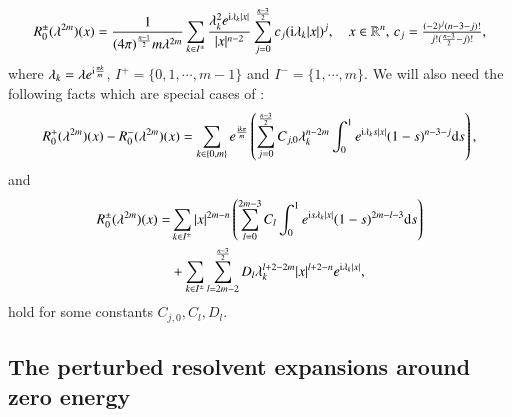 \documentclass[11pt,reqno]{amsart}
\def\d{{\rm d}}
\def\i{{\rm i}}
\numberwithin{equation}{section}
\theoremstyle{definition}
\begin{document}
\begin{equation}\label{eq2.8}
R_0^{\pm}(\lambda^{2m})(x)=\frac{1}{(4\pi)^{\frac{n-1}{2}}m\lambda^{2m}}\sum_{k\in I^{\pm}}\frac{\lambda_k^2e^{ \i\lambda_k|x|}}{|x|^{n-2}}\sum^{\frac{n-3}{2}}_{j=0}{c_j(\i\lambda_k|x|)^j},\quad x\in\mathbb{R}^n,\,\mbox{$c_j=\frac{(-2)^j(n-3-j)!}{j!(\frac{n-3}{2}-j)!}$},
\end{equation}
where $\lambda_k=\lambda e^{\i\frac{\pi k}{m}}$, $I^+=\{0,1,\cdots,m-1\}$ and $I^-=\{1,\cdots,m\}$. We will also need the following facts which are special cases of \cite[Proposition 2.1]{CHHZ}:
%
%
%
\begin{equation}\label{eq2.10}
	R_{0}^{+}(\lambda^{2m})(x)-R_{0}^{-}(\lambda^{2m})(x)=\sum_{k\in\{0,m\}}e^{\frac{\i k\pi}{m}}\left( \sum_{j=0}^{\frac{n-3}{2}}C_{j,0}\lambda_k^{n-2m}\int_{0}^{1}e^{\i\lambda_{k}s|x|}(1-s)^{n-3-j}\d s\right),
\end{equation}
and
\begin{equation}\label{equ4.17}
	\begin{split}
		R_{0}^{\pm}(\lambda^{2 m})(x)=&\sum_{k\in I^{\pm}}|x|^{2m-n} \left(\sum_{l=0}^{2m-3} C_{l} \int_{0}^{1} e^{\i s \lambda_{k}|x|}(1-s)^{2m-l-3}\d s\right) \\
		&+\sum_{k\in I^{\pm}}\sum_{l=2m-2}^{\frac{n-3}{2}}D_{l}\lambda_k^{l+2-2m}|x|^{l+2-n}e^{\i\lambda_{k}|x|},
	\end{split}
\end{equation}
hold for some constants $C_{j,0},C_l,D_l$.

\subsection{The perturbed resolvent expansions around zero energy}\label{section2.2}\
\end{document}
